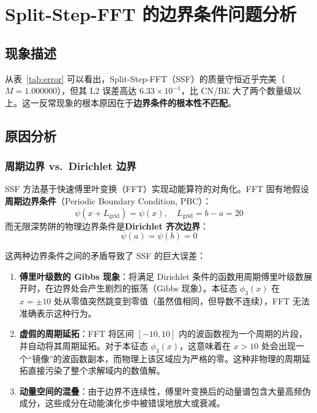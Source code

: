 \documentclass[12pt, a4paper]{article}
\begin{document}
\section{Split-Step-FFT 的边界条件问题分析}
\label{sec:ssf_analysis}

\subsection{现象描述}

从表~\ref{tab:error} 可以看出，Split-Step-FFT（SSF）的质量守恒近乎完美（$M = 1.000000$），但其 L2 误差高达 $6.33\times 10^{-1}$，比 CN/BE 大了两个数量级以上。这一反常现象的根本原因在于\textbf{边界条件的根本性不匹配}。

\subsection{原因分析}

\subsubsection{周期边界 vs.\ Dirichlet 边界}

SSF 方法基于快速傅里叶变换（FFT）实现动能算符的对角化。FFT 固有地假设\textbf{周期边界条件}（Periodic Boundary Condition, PBC）：
\[
\psi(x + L_{\text{grid}}) = \psi(x), \quad L_{\text{grid}} = b - a = 20
\]
而无限深势阱的物理边界条件是\textbf{Dirichlet 齐次边界}：
\[
\psi(a) = \psi(b) = 0
\]

这两种边界条件之间的矛盾导致了 SSF 的巨大误差：

\begin{enumerate}
    \item \textbf{傅里叶级数的 Gibbs 现象}：将满足 Dirichlet 条件的函数用周期傅里叶级数展开时，在边界处会产生剧烈的振荡（Gibbs 现象）。本征态 $\phi_3(x)$ 在 $x = \pm 10$ 处从零值突然跳变到零值（虽然值相同，但导数不连续），FFT 无法准确表示这种行为。

    \item \textbf{虚假的周期延拓}：FFT 将区间 $[-10, 10]$ 内的波函数视为一个周期的片段，并自动将其周期延拓。对于本征态 $\phi_3(x)$，这意味着在 $x > 10$ 处会出现一个``镜像''的波函数副本，而物理上该区域应为严格的零。这种非物理的周期延拓直接污染了整个求解域内的数值解。

    \item \textbf{动量空间的混叠}：由于边界不连续性，傅里叶变换后的动量谱包含大量高频伪成分，这些成分在动能演化步中被错误地放大或衰减。
\end{enumerate}
\end{document}
